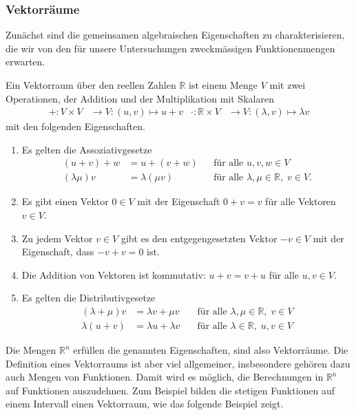 %
%
\subsubsection{Vektorräume}
Zunächst sind die gemeinsamen algebraischen Eigenschaften zu charakterisieren,
die wir von den für unsere Untersuchungen zweckmässigen Funktionenmengen
erwarten.

\begin{definition}[Vektorraum]
Ein Vektorraum über den reellen Zahlen $\mathbb{R}$ ist einem Menge $V$ mit
zwei Operationen, der Addition und der Multiplikation mit Skalaren
\begin{align*}
    +\colon V\times V         &\to V : (u,v)\mapsto u+v
&
\cdot\colon \mathbb{R}\times V&\to V : (\lambda,v) \mapsto\lambda v
\end{align*}
mit den folgenden Eigenschaften.
\begin{enumerate}
\item
Es gelten die Assoziativgesetze
\begin{align*}
(u+v)+w&=u+(v+w)&&\text{für alle $u,v,w\in V$}\\
(\lambda \mu)v&=\lambda(\mu v)&&\text{für alle $\lambda,\mu\in\mathbb{R},\;v\in V$.}
\end{align*}
\item
Es gibt einen Vektor $0\in V$ mit der Eigenschaft $0+v=v$ für alle
Vektoren $v\in V$.
\item
Zu jedem Vektor $v\in V$ gibt es den entgegengesetzten Vektor $-v\in V$
mit der Eigenschaft, dass $-v+v=0$ ist.
\item
Die Addition von Vektoren ist kommutativ: $u+v=v+u$ für alle $u,v\in V$.
\item
Es gelten die Distributivgesetze 
\begin{align*}
(\lambda + \mu) v &= \lambda v + \mu v
	&\quad\text{für alle $\lambda,\mu\in\mathbb{R},\;v\in V$}\\
\lambda(u+v)      &= \lambda u + \lambda v
	&\quad\text{für alle $\lambda\in\mathbb{R},\;u,v\in V$}
\end{align*}
\end{enumerate}
\end{definition}

Die Mengen $\mathbb{R}^n$ erfüllen die genannten Eigenschaften, sind
also Vektorräume.
Die Definition eines Vektorraums ist aber viel allgemeiner, insbesondere
gehören dazu auch Mengen von Funktionen.
Damit wird es möglich, die Berechnungen in $\mathbb{R}^n$ auf Funktionen
auszudehnen.
Zum Beispiel bilden die stetigen Funktionen auf einem Intervall einen
Vektorraum, wie das folgende Beispiel zeigt.

